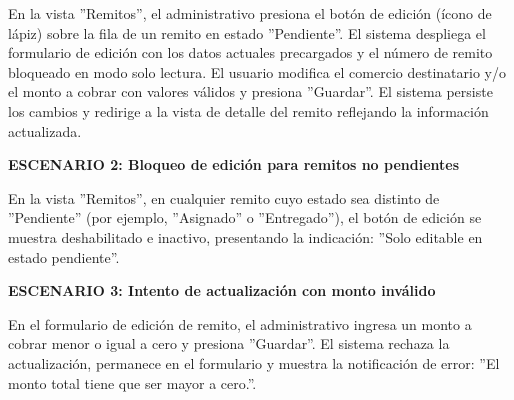 \documentclass[a4paper,9pt]{article}
\begin{document}
\begin{tcolorbox}[hucard, title={\textbf{HU-41: EDITAR REMITO} \hfill \scriptsize \colorbox{tealstatus}{\textbf{\ Accepted\ }} \quad \colorbox{white}{\textcolor{primarydark}{\textbf{\ 3 pts\ }}}}]
{En la vista ''Remitos'', el administrativo presiona el botón de edición (ícono de lápiz) sobre la fila de un remito en estado ''Pendiente''. El sistema despliega el formulario de edición con los datos actuales precargados y el número de remito bloqueado en modo solo lectura. El usuario modifica el comercio destinatario y/o el monto a cobrar con valores válidos y presiona ''Guardar''. El sistema persiste los cambios y redirige a la vista de detalle del remito reflejando la información actualizada.\par\vspace{2.5pt}
\noindent\textbf{\textcolor{secondarydark}{ESCENARIO 2:  Bloqueo de edición para remitos no pendientes}}\par\vspace{1pt}
En la vista ''Remitos'', en cualquier remito cuyo estado sea distinto de ''Pendiente'' (por ejemplo, ''Asignado'' o ''Entregado''), el botón de edición se muestra deshabilitado e inactivo, presentando la indicación: ''Solo editable en estado pendiente''.\par\vspace{2.5pt}
\noindent\textbf{\textcolor{secondarydark}{ESCENARIO 3:  Intento de actualización con monto inválido}}\par\vspace{1pt}
En el formulario de edición de remito, el administrativo ingresa un monto a cobrar menor o igual a cero y presiona ''Guardar''. El sistema rechaza la actualización, permanece en el formulario y muestra la notificación de error: ''El monto total tiene que ser mayor a cero.''.\par\vspace{2.5pt}
}\par
\end{tcolorbox}
\end{document}

